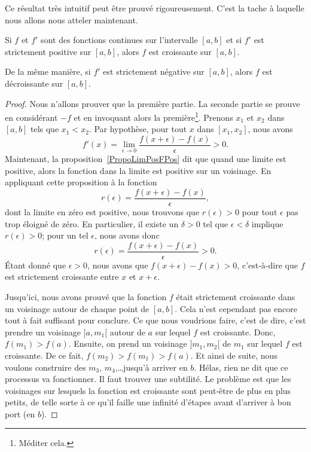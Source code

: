 Ce résultat très intuitif peut être prouvé rigoureusement. C'est la tache à laquelle nous allons nous atteler maintenant.

\begin{proposition} \label{PropGFkZMwD}
    Si $f$ et $f'$ sont des fonctions continues sur l'intervalle $[a,b]$ et si $f'$ est strictement positive sur $[a,b]$, alors $f$ est croissante sur $[a,b]$.

    De la même manière, si $f'$ est strictement négative sur $[a,b]$, alors $f$ est décroissante sur $[a,b]$.
\end{proposition}

\begin{proof}
    Nous n'allons prouver que la première partie. La seconde partie se prouve en considérant $-f$ et en invoquant alors la première\footnote{Méditer cela.}. Prenons $x_1$ et $x_2$ dans $[a,b]$ tels que $x_1<x_2$. Par hypothèse, pour tout $x$ dans $[x_1,x_2]$, nous avons
    \begin{equation}
        f'(x)=\lim_{\epsilon\to 0}\frac{ f(x+\epsilon)-f(x) }{\epsilon} >0.
    \end{equation}
    Maintenant, la proposition~\ref{PropoLimPosFPos} dit que quand une limite est positive, alors la fonction dans la limite est positive sur un voisinage. En appliquant cette proposition à la fonction
    \begin{equation}
        r(\epsilon)=\frac{ f(x+\epsilon)-f(x) }{ \epsilon },
    \end{equation}
    dont la limite en zéro est positive, nous trouvons que $r(\epsilon)>0$ pour tout $\epsilon$ pas trop éloigné de zéro. En particulier, il existe un $\delta>0$ tel que $\epsilon<\delta$ implique $r(\epsilon)>0$; pour un tel $\epsilon$, nous avons donc
    \begin{equation}
        r(\epsilon)=\frac{ f(x+\epsilon)-f(x) }{ \epsilon }>0.
    \end{equation}
    Étant donné que $\epsilon>0$, nous avons que $f(x+\epsilon)-f(x)>0$, c'est-à-dire que $f$ est strictement croissante entre $x$ et $x+\epsilon$.

    Jusqu'ici, nous avons prouvé que la fonction $f$ était strictement croissante dans un voisinage autour de chaque point de $[a,b]$. Cela n'est cependant pas encore tout à fait suffisant pour conclure. Ce que nous voudrions faire, c'est de dire, c'est prendre un voisinage $]a,m_1[$ autour de $a$ sur lequel $f$ est croissante. Donc, $f(m_1)>f(a)$. Ensuite, on prend un voisinage $]m_1,m_2[$ de $m_1$ sur lequel $f$ est croissante. De ce fait, $f(m_2)>f(m_1)>f(a)$. Et ainsi de suite, nous voulons construire des $m_3$, $m_4$,\ldots jusqu'à arriver en $b$. Hélas, rien ne dit que ce processus va fonctionner. Il faut trouver une subtilité. Le problème est que les voisinages sur lesquels la fonction est croissante sont peut-être de plus en plus petits, de telle sorte à ce qu'il faille une infinité d'étapes avant d'arriver à bon port (en $b$).


\end{proof}

